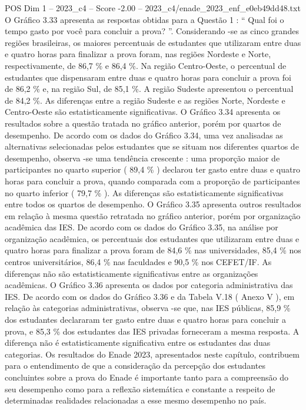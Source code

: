 \begin{textsample}{POS Dim 1 – 2023\_c4 – Score -2.00 – 2023\_c4/enade\_2023\_enf\_e0eb49dd48.txt}
O Gráfico 3.33 apresenta as respostas obtidas para a Questão 1 : “ Qual foi o tempo gasto por você para concluir a prova? ”.
Considerando -se as cinco grandes regiões brasileiras, os maiores percentuais de estudantes que utilizaram entre duas e quatro horas para finalizar a prova foram, nas regiões Nordeste e Norte, respectivamente, de 86,7 \% e 86,4 \%.
Na região Centro-Oeste, o percentual de estudantes que dispensaram entre duas e quatro horas para concluir a prova foi de 86,2 \% e, na região Sul, de 85,1 \%.
A região Sudeste apresentou o percentual de 84,2 \%.
As diferenças entre a região Sudeste e as regiões Norte, Nordeste e Centro-Oeste são estatisticamente significativas.
O Gráfico 3.34 apresenta os resultados sobre a questão tratada no gráfico anterior, porém por quartos de desempenho.
De acordo com os dados do Gráfico 3.34, uma vez analisadas as alternativas selecionadas pelos estudantes que se situam nos diferentes quartos de desempenho, observa -se uma tendência crescente : uma proporção maior de participantes no quarto superior ( 89,4 \% ) declarou ter gasto entre duas e quatro horas para concluir a prova, quando comparada com a proporção de participantes no quarto inferior ( 79,7 \% ).
As diferenças são estatisticamente significativas entre todos os quartos de desempenho.
O Gráfico 3.35 apresenta outros resultados em relação à mesma questão retratada no gráfico anterior, porém por organização acadêmica das IES.
De acordo com os dados do Gráfico 3.35, na análise por organização acadêmica, os percentuais dos estudantes que utilizaram entre duas e quatro horas para finalizar a prova foram de 84,6 \% nas universidades, 85,4 \% nos centros universitários, 86,4 \% nas faculdades e 90,5 \% nos CEFET/IF.
As diferenças não são estatisticamente significativas entre as organizações acadêmicas.
O Gráfico 3.36 apresenta os dados por categoria administrativa das IES.
De acordo com os dados do Gráfico 3.36 e da Tabela V.18 ( Anexo V ), em relação às categorias administrativas, observa -se que, nas IES públicas, 85,9 \% dos estudantes declararam ter gasto entre duas e quatro horas para concluir a prova, e 85,3 \% dos estudantes das IES privadas forneceram a mesma resposta.
A diferença não é estatisticamente significativa entre os estudantes das duas categorias.
Os resultados do Enade 2023, apresentados neste capítulo, contribuem para o entendimento de que a consideração da percepção dos estudantes concluintes sobre a prova do Enade é importante tanto para a compreensão do seu desempenho como para a reflexão sistemática e constante a respeito de determinadas realidades relacionadas a esse mesmo desempenho no país.

\end{textsample}
